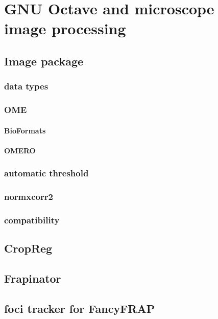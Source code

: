 \chapter{GNU Octave and microscope image processing}
\label{ch:octave}


\section{Image package}
  \subsection{data types}

  \subsection{OME}

    \subsubsection{BioFormats}
    \subsubsection{OMERO}
  \subsection{automatic threshold}
  \subsection{normxcorr2}


  \subsection{compatibility}

\section{CropReg}
\label{sec:cropreg}
\section{Frapinator}
\label{sec:frapinator}
\section{foci tracker for FancyFRAP}

